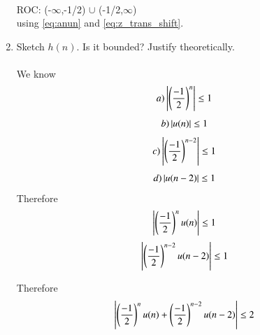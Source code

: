 \documentclass[journal,12pt,twocolumn]{IEEEtran}
\renewcommand\thesection{\arabic{section}}
\begin{document}
\begin{enumerate}[label=\thesection.\arabic*]
\begin{align}
\end{align}
ROC: (-$\infty$,-1/2) $\cup$ (-1/2,$\infty$)
\\
using \eqref{eq:anun} and \eqref{eq:z_trans_shift}.
\item Sketch $h(n)$. Is it bounded? Justify theoretically.
\\
\solution 
\\
We know 
\begin{equation}
 a)   \left\vert\left( \frac{-1}{2}\right)^n\right\vert \leq 1
\end{equation}
\begin{equation}
 b)   \left\vert u(n)\right\vert \leq 1
\end{equation}
\begin{equation}
 c)   \left\vert\left( \frac{-1}{2}\right)^{n-2}\right\vert \leq 1
\end{equation}
\begin{equation}
 d)   \left\vert u(n-2)\right\vert \leq 1
\end{equation}
Therefore 
\begin{equation}
    \left\vert\left( \frac{-1}{2}\right)^n u(n)\right\vert \leq 1
\end{equation}
\begin{equation}
    \left\vert\left( \frac{-1}{2}\right)^{n-2} u(n-2)\right\vert \leq 1
\end{equation}

Therefore
\begin{equation}
    \left\vert\left( \frac{-1}{2}\right)^n u(n) + \left( \frac{-1}{2}\right)^{n-2} u(n-2)\right\vert \leq 2
\end{equation}


\end{enumerate}
\end{document}
